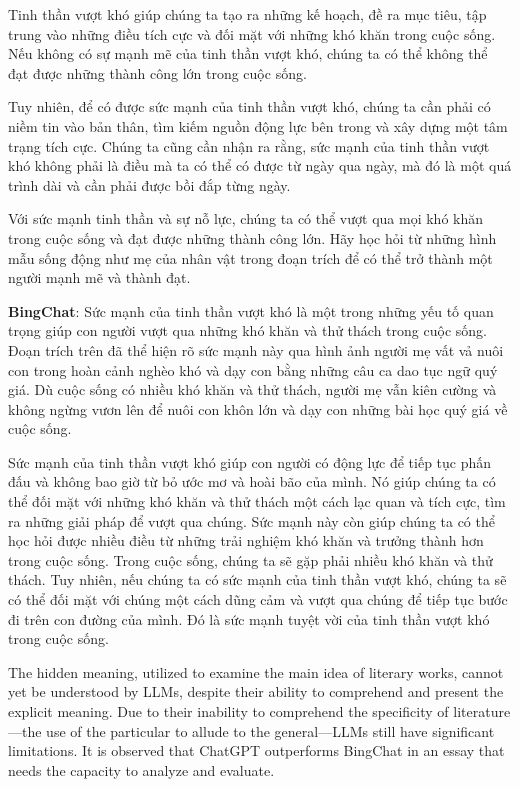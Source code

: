 \documentclass{article}
\begin{document}
{\begin{mdframed}[linewidth=1pt,linecolor=red]
		Tinh thần vượt khó giúp chúng ta tạo ra những kế hoạch, đề ra mục tiêu, tập trung vào những điều tích cực và đối mặt với những khó khăn trong cuộc sống. Nếu không có sự mạnh mẽ của tinh thần vượt khó, chúng ta có thể không thể đạt được những thành công lớn trong cuộc sống.
		
		Tuy nhiên, để có được sức mạnh của tinh thần vượt khó, chúng ta cần phải có niềm tin vào bản thân, tìm kiếm nguồn động lực bên trong và xây dựng một tâm trạng tích cực. Chúng ta cũng cần nhận ra rằng, sức mạnh của tinh thần vượt khó không phải là điều mà ta có thể có được từ ngày qua ngày, mà đó là một quá trình dài và cần phải được bồi đắp từng ngày.
		
		Với sức mạnh tinh thần và sự nỗ lực, chúng ta có thể vượt qua mọi khó khăn trong cuộc sống và đạt được những thành công lớn. Hãy học hỏi từ những hình mẫu sống động như mẹ của nhân vật trong đoạn trích để có thể trở thành một người mạnh mẽ và thành đạt.
		
		\textbf{BingChat}: 
		Sức mạnh của tinh thần vượt khó là một trong những yếu tố quan trọng giúp con người vượt qua những khó khăn và thử thách trong cuộc sống. Đoạn trích trên đã thể hiện rõ sức mạnh này qua hình ảnh người mẹ vất vả nuôi con trong hoàn cảnh nghèo khó và dạy con bằng những câu ca dao tục ngữ quý giá. Dù cuộc sống có nhiều khó khăn và thử thách, người mẹ vẫn kiên cường và không ngừng vươn lên để nuôi con khôn lớn và dạy con những bài học quý giá về cuộc sống.
		
		Sức mạnh của tinh thần vượt khó giúp con người có động lực để tiếp tục phấn đấu và không bao giờ từ bỏ ước mơ và hoài bão của mình. Nó giúp chúng ta có thể đối mặt với những khó khăn và thử thách một cách lạc quan và tích cực, tìm ra những giải pháp để vượt qua chúng. Sức mạnh này còn giúp chúng ta có thể học hỏi được nhiều điều từ những trải nghiệm khó khăn và trưởng thành hơn trong cuộc sống.
		Trong cuộc sống, chúng ta sẽ gặp phải nhiều khó khăn và thử thách. Tuy nhiên, nếu chúng ta có sức mạnh của tinh thần vượt khó, chúng ta sẽ có thể đối mặt với chúng một cách dũng cảm và vượt qua chúng để tiếp tục bước đi trên con đường của mình. Đó là sức mạnh tuyệt vời của tinh thần vượt khó trong cuộc sống.
		
	\end{mdframed}
	
	The hidden meaning, utilized to examine the main idea of literary works, cannot yet be understood by LLMs, despite their ability to comprehend and present the explicit meaning. Due to their inability to comprehend the specificity of literature—the use of the particular to allude to the general—LLMs still have significant limitations. It is observed that ChatGPT outperforms BingChat in an essay that needs the capacity to analyze and evaluate.
	
}
\end{document}
